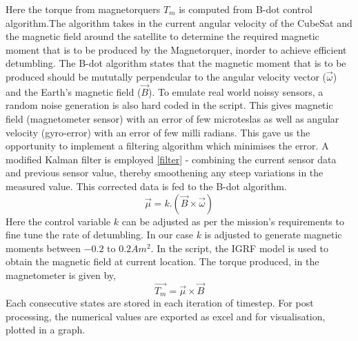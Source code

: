 Here the torque from magnetorquers $T_m$ is computed from B-dot control algorithm.The algorithm takes in the current angular velocity of the CubeSat and the magnetic field around the satellite to determine the required magnetic moment that is to be produced by the Magnetorquer, inorder to achieve efficient detumbling. The B-dot algorithm states that the magnetic moment that is to be produced should be mututally perpendcular to the angular velocity vector ($\vec{\omega}$) and the Earth's magnetic field ($\vec{B}$). To emulate real world noissy sensors, a random noise generation is also hard coded in the script. This gives magnetic field (magnetometer sensor) with an error of few microteslas as well as angular velocity (gyro-error)  with an error of few milli radians. This gave us the opportunity to implement a filtering algorithm which minimises the error. A modified Kalman filter is employed \ref{filter} - combining the current sensor data and previous sensor value, thereby smoothening any steep variations in the measured value. This corrected data is fed to the B-dot algorithm.
$$\vec{\mu} = k.\left(\vec{B}\times\vec{\omega}\right)$$
Here the control variable $k$ can be adjusted as per the mission's requirements to fine tune the rate of detumbling. In our case $k$ is adjusted to generate magnetic moments between $-0.2\text{ to }0.2Am^2$. In the script, the IGRF model is used to obtain the magnetic field at current location. The torque produced, in the magnetometer is given by, 	
$$\vec{T_m} = \vec{\mu}\times\vec{B}$$
Each consecutive states are stored in each iteration of timestep. For post processing, the numerical values are exported as excel and for visualisation, plotted in a graph.  

